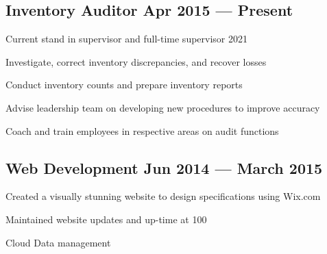 \documentclass[letter,10pt]{article}
\begin{document}
\subsection{{Inventory Auditor \hfill Apr 2015 --- Present}}
\begin{zitemize}
\item Current stand in supervisor and full-time supervisor 2021
\item Investigate, correct inventory discrepancies, and recover losses
\item Conduct inventory counts and prepare inventory reports
\item Advise leadership team on developing new procedures to improve accuracy
\item Coach and train employees in respective areas on audit functions
\end{zitemize}

\subsection{{Web Development \hfill  Jun 2014 --- March 2015}}
\begin{zitemize}
\item Created a visually stunning website to design specifications using Wix.com
\item Maintained website updates and up-time at 100%
\item Cloud Data management
\end{zitemize}

\end{document}
